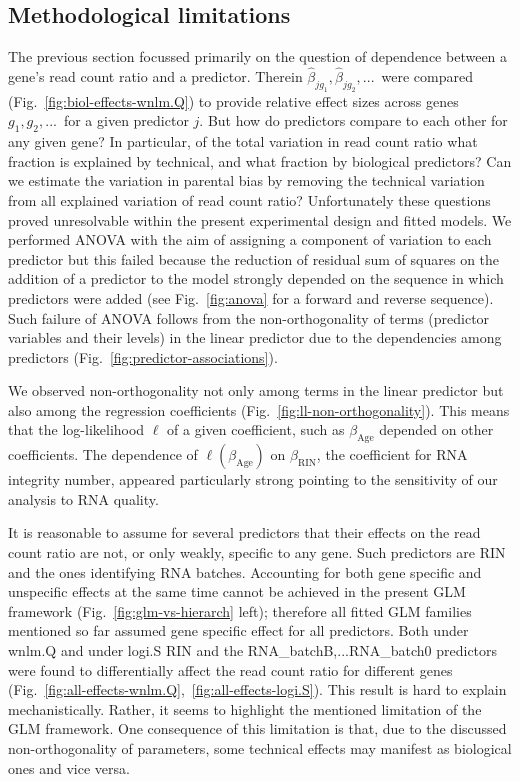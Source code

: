 \documentclass[letterpaper]{article}
\begin{document}
\subsection{Methodological limitations}
\label{sec:limitations}

The previous section focussed primarily on the question of dependence between
a gene's read count ratio and a predictor.  Therein \(\hat\beta_{jg_1},
\hat\beta_{jg_2},...\)~were compared (Fig.~\ref{fig:biol-effects-wnlm.Q}) to
provide relative effect sizes across genes \(g_1, g_2,...\)~for a given
predictor \(j\). But how do predictors compare to each other for any given
gene? In particular, of the total variation in read count ratio what fraction
is explained by technical, and what fraction by biological predictors? Can we
estimate the variation in parental bias by removing the technical variation
from all explained variation of read count ratio?  Unfortunately these
questions proved unresolvable within the present experimental design and
fitted models. We performed ANOVA with the aim of assigning a component of
variation to each predictor but this failed because the reduction of residual
sum of squares on the addition of a predictor to the model strongly depended
on the sequence in which predictors were added (see Fig.~\ref{fig:anova} for a
forward and reverse sequence). Such failure of ANOVA follows from
the non-orthogonality of terms (predictor variables and their levels) in the
linear predictor due to the dependencies among predictors
(Fig.~\ref{fig:predictor-associations}).

We observed non-orthogonality not only among terms in the linear predictor but
also among the regression coefficients (Fig.~\ref{fig:ll-non-orthogonality}).
This means that the log-likelihood \(\ell\) of a given coefficient, such as
\(\beta_\mathrm{Age}\) depended on other coefficients.  The dependence of
\(\ell(\beta_\mathrm{Age})\) on \(\beta_\mathrm{RIN}\), the coefficient for
RNA integrity number, appeared particularly strong pointing to the sensitivity
of our analysis to RNA quality.

It is reasonable to assume for several predictors that their effects on the
read count ratio are not, or only weakly, specific to any gene.  Such predictors are RIN
and the ones identifying RNA batches.  Accounting for both gene specific and
unspecific effects at the same time cannot be achieved in the present GLM
framework (Fig.~\ref{fig:glm-vs-hierarch} left); therefore all fitted GLM
families mentioned so far assumed gene specific effect for all predictors.
Both under wnlm.Q and under logi.S RIN and the RNA\_batchB,...RNA\_batch0
predictors were found to differentially affect the read count ratio for
different genes
(Fig.~\ref{fig:all-effects-wnlm.Q},~\ref{fig:all-effects-logi.S}).  This result
is hard to explain mechanistically.  Rather, it seems to highlight the
mentioned limitation of the GLM framework.  One consequence of this limitation
is that, due to the discussed non-orthogonality of parameters, some technical
effects may manifest as biological ones and vice versa.
\end{document}
